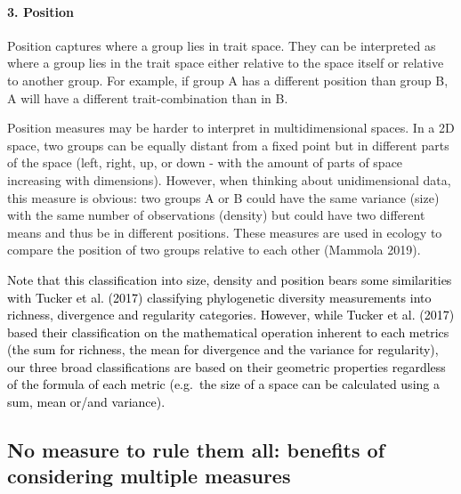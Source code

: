\documentclass[]{article}
\let\oldparagraph\paragraph
\renewcommand{\paragraph}[1]{\oldparagraph{#1}\mbox{}}
\begin{document}
\paragraph{3. Position}\label{position}

Position captures where a group lies in trait space. They can be
interpreted as where a group lies in the trait space either relative to
the space itself or relative to another group. For example, if group A
has a different position than group B, A will have a different
trait-combination than in B.

Position measures may be harder to interpret in multidimensional spaces.
In a 2D space, two groups can be equally distant from a fixed point but
in different parts of the space (left, right, up, or down - with the
amount of parts of space increasing with dimensions). However, when
thinking about unidimensional data, this measure is obvious: two groups
A or B could have the same variance (size) with the same number of
observations (density) but could have two different means and thus be in
different positions. These measures are used in ecology to compare the
position of two groups relative to each other (Mammola 2019).

\textcolor{black}{ Note that this classification into
size, density and position bears some similarities with Tucker et al.
(2017) classifying phylogenetic diversity measurements into richness,
divergence and regularity categories. However, while Tucker et al.
(2017) based their classification on the mathematical operation inherent
to each metrics (the sum for richness, the mean for divergence and the
variance for regularity), our three broad classifications are based on
their geometric properties regardless of the formula of each metric
(e.g.~the size of a space can be calculated using a sum, mean or/and
variance). }

\subsection{No measure to rule them all: benefits of considering
multiple
measures}\label{no-measure-to-rule-them-all-benefits-of-considering-multiple-measures}
\end{document}
